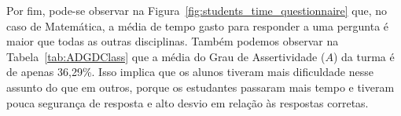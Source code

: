 %

Por fim, pode-se observar na Figura~\ref{fig:students_time_questionnaire} que, no caso de Matemática, a média de tempo gasto para responder a uma pergunta é maior que todas as outras disciplinas. Também podemos observar na Tabela~\ref{tab:ADGDClass} que a média do Grau de Assertividade ($A$) da turma é de apenas 36,29\%.
Isso implica que os alunos tiveram mais dificuldade nesse assunto do que em outros, porque os estudantes passaram mais tempo e tiveram pouca segurança de resposta e alto desvio em relação às respostas corretas.


